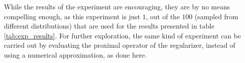 While the results of the experiment are encouraging, they are by no means compelling enough, as this experiment is just $1$, out of the $100$ (sampled from different distributions) that are used for the results presented in table \ref{tab:exp_results}. For further exploration, the same kind of experiment can be carried out by evaluating the proximal operator of the regularizer, instead of using a numerical approximation, as done here.  
